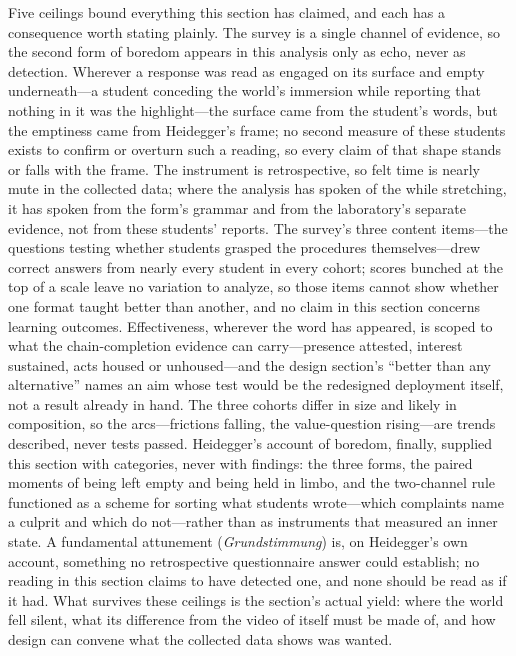 Five ceilings bound everything this section has claimed, and each has
a consequence worth stating plainly. The survey is a single channel of
evidence, so the second form of boredom appears in this analysis only
as echo, never as detection. Wherever a response was read as engaged
on its surface and empty underneath---a student conceding the world's
immersion while reporting that nothing in it was the highlight---the
surface came from the student's words, but the emptiness came from
Heidegger's frame; no second measure of these students exists to
confirm or overturn such a reading, so every claim of that shape
stands or falls with the frame. The instrument is
retrospective, so felt time is nearly mute in the collected data;
where the analysis has spoken of the while stretching, it has spoken
from the form's grammar and from the laboratory's separate evidence,
not from these students' reports. The survey's three content
items---the questions testing whether students grasped the procedures
themselves---drew correct answers from nearly every student in every
cohort; scores bunched at the top of a scale leave no variation to
analyze, so those items cannot show whether one format taught better
than another, and no claim in this section concerns learning outcomes.
Effectiveness,
wherever the word has appeared, is scoped to what the chain-completion
evidence can carry---presence attested, interest sustained, acts
housed or unhoused---and the design section's ``better than any
alternative'' names an aim whose test would be the redesigned
deployment itself, not a result already in hand. The three cohorts
differ in size and likely in composition, so the arcs---frictions
falling, the value-question rising---are trends described, never tests
passed. Heidegger's account of boredom, finally, supplied this section
with categories, never with findings: the three forms, the paired
moments of being left empty and being held in limbo, and the
two-channel rule functioned as a scheme for sorting what students
wrote---which complaints name a culprit and which do not---rather than
as instruments that measured an inner state. A fundamental attunement
(\textit{Grundstimmung}) is, on Heidegger's own account, something no
retrospective questionnaire answer could establish; no reading in this
section claims to have detected one, and none should be read as if it
had. What survives these
ceilings is the section's actual yield: where the world fell silent,
what its difference from the video of itself must be made of, and how
design can convene what the collected data shows was wanted.
